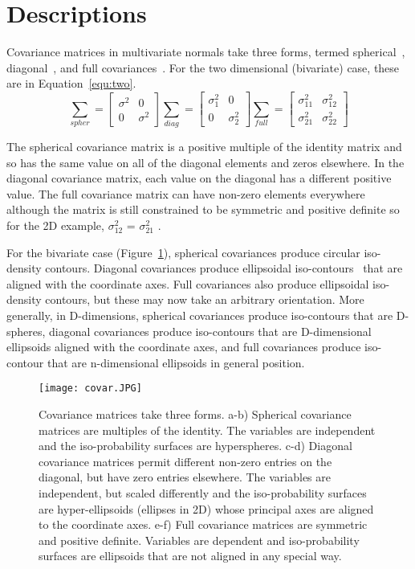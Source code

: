 \documentclass[10pt,twocolumn,letterpaper]{article}
\begin{document}
\section{Descriptions}
Covariance matrices in multivariate normals take three forms, termed spherical~\cite{Ballauff2007Spherical}, diagonal~\cite{Carlson1988Covariance}, and full covariances~\cite{Povey2006Feature}. For the two dimensional (bivariate) case, these are in Equation~\ref{equ:two}.
\begin{equation}\label{equ:two}
  \sum_{spher} = \begin{bmatrix}
\sigma^2&0\\
0&\sigma^2
\end{bmatrix}
  \sum_{diag} = \begin{bmatrix}
\sigma_1^2&0\\
0&\sigma_2^2
\end{bmatrix}
  \sum_{full} = \begin{bmatrix}
\sigma_{11}^2&\sigma_{12}^2\\
\sigma_{21}^2&\sigma_{22}^2
\end{bmatrix}
\end{equation}
\par The spherical covariance matrix is a positive multiple of the identity matrix and so has the same value on all of the diagonal elements and zeros elsewhere. In the diagonal covariance matrix, each value on the diagonal has a different positive value. The full covariance matrix can have non-zero elements everywhere although the matrix is still constrained to be symmetric and positive definite so for the 2D example, $\sigma_{12}^2$ = $\sigma_{21}^2$ .
\par For the bivariate case (Figure~\ref{fig:onecol}), spherical covariances produce circular iso-density contours. Diagonal covariances produce ellipsoidal iso-contours~\cite{Raymond2012A} that are aligned with the coordinate axes. Full covariances also produce ellipsoidal iso-density contours, but these may now take an arbitrary orientation. More generally, in D-dimensions, spherical covariances produce iso-contours that are D-spheres, diagonal covariances produce iso-contours that are D-dimensional ellipsoids aligned with the coordinate axes, and full covariances produce iso-contour that are n-dimensional ellipsoids in general position.
\begin{figure}
  \centering
  \texttt{[image: covar.JPG]}\\
  \caption{ Covariance matrices take three forms. a-b) Spherical covariance matrices are multiples of the identity. The variables are independent and
the iso-probability surfaces are hyperspheres. c-d) Diagonal covariance matrices permit different non-zero entries on the diagonal, but have zero entries
elsewhere. The variables are independent, but scaled differently and the iso-probability surfaces are hyper-ellipsoids (ellipses in 2D) whose principal axes
are aligned to the coordinate axes. e-f) Full covariance matrices are symmetric and positive definite. Variables are dependent and iso-probability surfaces are ellipsoids that are not aligned in any special way.}\label{fig:onecol}
\end{figure}
\end{document}
